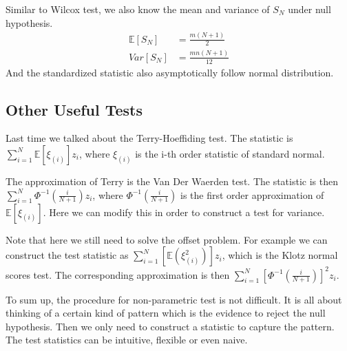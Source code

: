 \documentclass[twoside]{article}
\begin{document}
	Similar to Wilcox test, we also know the mean and variance of $S_N$ under null hypothesis. 
	\begin{align*}
		\mathbb{E} \left[ S_N \right] &= \frac{m(N+1)}{2} \\
		Var \left[ S_N \right] &= \frac{mn (N+1)}{12}
	\end{align*}
	And the standardized statistic also asymptotically follow normal distribution. 
	
	\subsection{Other Useful Tests}
	Last time we talked about the Terry-Hoeffiding test. The statistic is $
	\sum_{i=1}^{N} \mathbb{E} \left[ \xi_{(i)} \right] z_i$, where $\xi_{(i)}$ is the i-th order statistic of standard normal. 
	
	The approximation of Terry is the Van Der Waerden test. The statistic is then $
	\sum_{i=1}^{N} \Phi^{-1} \left( \frac{i}{N+1} \right) z_i
	$, where $\Phi^{-1} \left( \frac{i}{N+1} \right)$ is the first order approximation of $\mathbb{E} \left[ \xi_{(i)} \right]$. Here we can modify this in order to construct a test for variance. 
	
	Note that here we still need to solve the offset problem. For example we can construct the test statistic as $\sum_{i=1}^{N} \left[ \mathbb{E} ( \xi_{(i)}^2 ) \right] z_i$, which is the Klotz normal scores test. The corresponding approximation is then $\sum_{i=1}^{N} \left[ \Phi^{-1} \left( \frac{i}{N+1} \right) \right]^2 z_i$. 
	
	To sum up, the procedure for non-parametric test is not difficult. It is all about thinking of a certain kind of pattern which is the evidence to reject the null hypothesis. Then we only need to construct a statistic to capture the pattern. The test statistics can be intuitive, flexible or even naive. 
	
\end{document}
